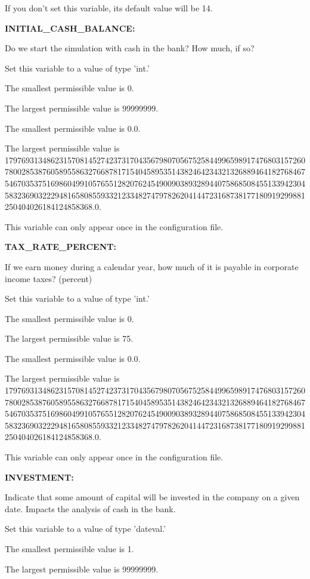 If you don't set this variable, its default value will be 14.


\textbf{INITIAL\_CASH\_BALANCE:}


Do we start the simulation with cash in the bank?  How much, if so?

Set this variable to a value of type 'int.'

The smallest permissible value is 0.

The largest permissible value is 99999999.

The smallest permissible value is 0.0.

The largest permissible value is 179769313486231570814527423731704356798070567525844996598917476803157260780028538760589558632766878171540458953514382464234321326889464182768467546703537516986049910576551282076245490090389328944075868508455133942304583236903222948165808559332123348274797826204144723168738177180919299881250404026184124858368.0.

This variable can only appear once in the configuration file.


\textbf{TAX\_RATE\_PERCENT:}


If we earn money during a calendar year, how much of it is payable in corporate income taxes? (percent)

Set this variable to a value of type 'int.'

The smallest permissible value is 0.

The largest permissible value is 75.

The smallest permissible value is 0.0.

The largest permissible value is 179769313486231570814527423731704356798070567525844996598917476803157260780028538760589558632766878171540458953514382464234321326889464182768467546703537516986049910576551282076245490090389328944075868508455133942304583236903222948165808559332123348274797826204144723168738177180919299881250404026184124858368.0.

This variable can only appear once in the configuration file.


\textbf{INVESTMENT:}


Indicate that some amount of capital will be invested in the company on a given date.  Impacts the analysis of cash in the bank.

Set this variable to a value of type 'dateval.'

The smallest permissible value is 1.

The largest permissible value is 99999999.

